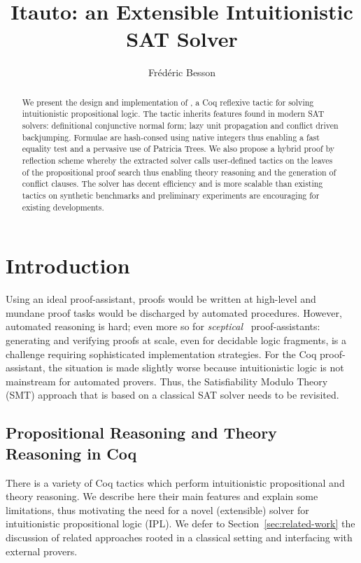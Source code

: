 \documentclass[utf8,a4paper,UKenglish,cleveref, autoref, thm-restate]{lipics-v2019}
\title{Itauto: an Extensible Intuitionistic SAT Solver}
\author{Frédéric Besson}{Inria, Univ Rennes, IRISA}{frederic.besson@inria.fr}{}{}
\begin{document}
\maketitle

\begin{abstract}
  We present the design and implementation of , a Coq
  reflexive tactic for solving intuitionistic propositional logic. The
  tactic inherits features found in modern SAT solvers: definitional
  conjunctive normal form; lazy unit propagation and conflict driven
  backjumping.
  Formulae are hash-consed using native integers thus enabling a
  fast equality test and a pervasive use of Patricia Trees.
  We also propose a hybrid proof by reflection scheme whereby the
  extracted solver calls user-defined tactics on the leaves of the
  propositional proof search thus enabling theory reasoning and the
  generation of conflict clauses.
  The solver has decent efficiency and is more scalable than existing
  tactics on synthetic benchmarks and preliminary experiments are
  encouraging for existing developments.
\end{abstract}


\section{Introduction}
\label{sec:intro}
Using an ideal proof-assistant, proofs would be written at high-level
and mundane proof tasks would be discharged by automated procedures.
%
However, automated reasoning is hard; even more so for
\emph{sceptical}~\cite{HarrisonT98} proof-assistants: generating and
verifying proofs at scale, even for decidable logic fragments, is a
challenge requiring sophisticated implementation strategies.
%
For the Coq proof-assistant, the situation is made slightly worse
because intuitionistic logic is not mainstream for automated provers.
Thus, the Satisfiability Modulo Theory (SMT) approach that is based on a
classical SAT solver needs to be revisited. 

\subsection{Propositional Reasoning and Theory Reasoning in Coq}
\label{sec:prop-in-coq}

There is a variety of Coq tactics which perform intuitionistic
propositional and theory reasoning. We describe here their main
features and explain some limitations, thus motivating the need for a
novel (extensible) solver for intuitionistic propositional logic
(IPL). We defer to Section~\ref{sec:related-work} the discussion of
related approaches rooted in a classical setting and interfacing with
external provers.
\end{document}
